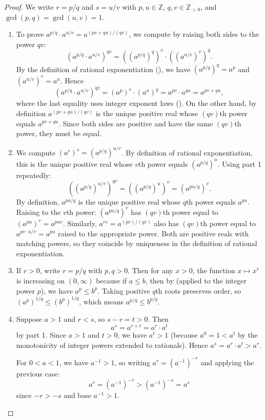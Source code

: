 \begin{proof}
We write $r = p/q$ and $s = u/v$ with $p,u \in \mathbb{Z}$, $q,v \in \mathbb{Z}_{>0}$, and $\gcd(p,q) = \gcd(u,v) = 1$.

\begin{enumerate}
    \item To prove $a^{p/q} \cdot a^{u/v} = a^{(pv+qu)/(qv)}$, we compute by raising both sides to the power $qv$:
    $$\left(a^{p/q} \cdot a^{u/v}\right)^{qv} = \left(\left(a^{p/q}\right)^q\right)^v \cdot \left(\left(a^{u/v}\right)^v\right)^q.$$
    By the definition of rational exponentiation (), we have $\left(a^{p/q}\right)^q = a^p$ and $\left(a^{u/v}\right)^v = a^u$. Hence
    $$\left(a^{p/q} \cdot a^{u/v}\right)^{qv} = (a^p)^v \cdot (a^u)^q = a^{pv} \cdot a^{qu} = a^{pv+qu},$$
    where the last equality uses integer exponent laws (). On the other hand, by definition $a^{(pv+qu)/(qv)}$ is the unique positive real whose $(qv)$th power equals $a^{pv+qu}$. Since both sides are positive and have the same $(qv)$th power, they must be equal.

    \item We compute $\left(a^r\right)^s = (a^{p/q})^{u/v}$. By definition of rational exponentiation, this is the unique positive real whose $v$th power equals $\left(a^{p/q}\right)^u$. Using part 1 repeatedly:
    $$\left(\left(a^{p/q}\right)^{u/v}\right)^{qv} = \left(\left(a^{p/q}\right)^u\right)^v = \left(a^{pu/q}\right)^v.$$
    By definition, $a^{pu/q}$ is the unique positive real whose $q$th power equals $a^{pu}$. Raising to the $v$th power: $(a^{pu/q})^v$ has $(qv)$th power equal to $(a^{pu})^v = a^{puv}$. Similarly, $a^{rs} = a^{(pv)/(qv)}$ also has $(qv)$th power equal to $a^{p v \cdot u / v} = a^{pu}$ raised to the appropriate power. Both are positive reals with matching powers, so they coincide by uniqueness in the definition of rational exponentiation.

    \item If $r > 0$, write $r = p/q$ with $p,q > 0$. Then for any $x > 0$, the function $x \mapsto x^r$ is increasing on $(0,\infty)$ because if $a \leq b$, then by  (applied to the integer power $p$), we have $a^p \leq b^p$. Taking positive $q$th roots preserves order, so $(a^p)^{1/q} \leq (b^p)^{1/q}$, which means $a^{p/q} \leq b^{p/q}$.

    \item Suppose $a > 1$ and $r < s$, so $s - r = t > 0$. Then
    $$a^s = a^{r+t} = a^r \cdot a^t$$
    by part 1. Since $a > 1$ and $t > 0$, we have $a^t > 1$ (because $a^0 = 1 < a^t$ by the monotonicity of integer powers extended to rationals). Hence $a^s = a^r \cdot a^t > a^r$.

    For $0 < a < 1$, we have $a^{-1} > 1$, so writing $a^r = (a^{-1})^{-r}$ and applying the previous case:
    $$a^r = (a^{-1})^{-r} > (a^{-1})^{-s} = a^s$$
    since $-r > -s$ and base $a^{-1} > 1$.
\end{enumerate}
\end{proof}
